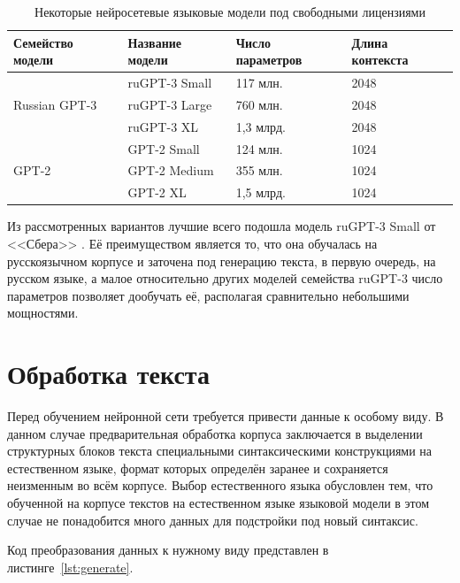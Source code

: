 \begin{table}[]
\caption{Некоторые нейросетевые языковые модели под свободными лицензиями}
\begin{tabular}{|l|l|l|l|}
\hline
Семейство модели               & Название модели & Число параметров & Длина контекста \\ \hline
\multirow{3}{*}{Russian GPT-3} & ruGPT-3 Small   & 117 млн.         & 2048            \\ \cline{2-4} 
                                & ruGPT-3 Large   & 760 млн.         & 2048            \\ \cline{2-4} 
                                & ruGPT-3 XL      & 1,3 млрд.        & 2048            \\ \hline
\multirow{3}{*}{GPT-2}         & GPT-2 Small     & 124 млн.         & 1024            \\ \cline{2-4} 
                                & GPT-2 Medium    & 355 млн.         & 1024            \\ \cline{2-4} 
                                & GPT-2 XL        & 1,5 млрд.        & 1024            \\ \hline
\end{tabular}
\label{tab:models}
\end{table}

Из рассмотренных вариантов лучшие всего подошла модель ruGPT-3 Small от <<Сбера>> \cite{art:sber_pr}. Её преимуществом является то, что она обучалась на русскоязычном корпусе и заточена под генерацию текста, в первую очередь, на русском языке, а малое относительно других моделей семейства ruGPT-3 число параметров позволяет дообучать её, располагая сравнительно небольшими мощностями.

\section{Обработка текста}

Перед обучением нейронной сети требуется привести данные к особому виду. В данном случае предварительная обработка корпуса заключается в выделении структурных блоков текста специальными синтаксическими конструкциями на естественном языке, формат которых определён заранее и сохраняется неизменным во всём корпусе. Выбор естественного языка обусловлен тем, что обученной на корпусе текстов на естественном языке языковой модели в этом случае не понадобится много данных для подстройки под новый синтаксис.

Код преобразования данных к нужному виду представлен в листинге \ref*{lst:generate}.

